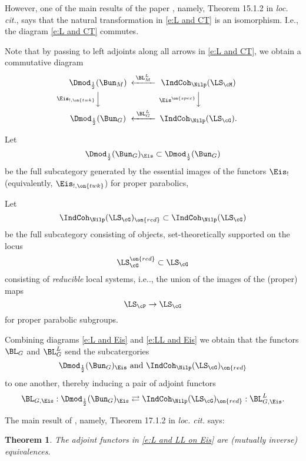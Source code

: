 \documentclass[9pt]{amsart}
\newtheorem{thm}[subsubsection]{Theorem}
\theoremstyle{remark}
\theoremstyle{definition}
\theoremstyle{remark}
\numberwithin{equation}{section}
\begin{document}
\medskip

However, one of the main results of the paper \cite{GLC3}, namely, Theorem 15.1.2 in {\it loc. cit.}, says
that the natural transformation in \eqref{e:L and CT} is an isomorphism. I.e., the diagram
\eqref{e:L and CT} commutes. 

\sssec{}

Note that by passing to left adjoints along all arrows in \eqref{e:L and CT}, we obtain a commutative diagram 
\begin{equation} \label{e:LL and Eis}
\CD
\Dmod_{\frac{1}{2}}(\Bun_M) @<{\BL^L_M}<<  \IndCoh_\Nilp(\LS_\cM)  \\
@V{\Eis_{!,\on{twk}}}VV @V{\Eis^{\on{spec}}}VV \\
\Dmod_{\frac{1}{2}}(\Bun_G) @<{\BL^L_G}<< \IndCoh_\Nilp(\LS_\cG). 
\endCD
\end{equation} 

\sssec{}

Let 
$$\Dmod_{\frac{1}{2}}(\Bun_G)_{\Eis}\subset \Dmod_{\frac{1}{2}}(\Bun_G)$$
be the full subcategory generated by the essential images of the functors $\Eis_!$ (equivalently, $\Eis_{!,\on{twk}}$) for proper
parabolics,

\medskip

Let 
$$\IndCoh_\Nilp(\LS_\cG)_{\on{red}}\subset  \IndCoh_\Nilp(\LS_\cG)$$
be the full subcategory consisting of objects, set-theoretically supported on the locus
$$\LS^{\on{red}}_\cG\subset \LS_\cG$$
consisting of \emph{reducible} local systems, i.e.., the union of the images of the (proper) maps
$$\LS_\cP\to \LS_\cG$$
for proper parabolic subgroups.

\medskip

Combining diagrams \eqref{e:L and Eis} and \eqref{e:LL and Eis} we obtain that the functors 
$\BL_G$ and $\BL_G^L$ send the subcatergories
$$\Dmod_{\frac{1}{2}}(\Bun_G)_{\Eis} \text{ and }  \IndCoh_\Nilp(\LS_\cG)_{\on{red}}$$
to one another, thereby inducing a pair of adjoint functors
\begin{equation} \label{e:L and LL on Eis}
\BL_{G,\Eis}:\Dmod_{\frac{1}{2}}(\Bun_G)_{\Eis}\rightleftarrows \IndCoh_\Nilp(\LS_\cG)_{\on{red}}:\BL^L_{G,\Eis}.
\end{equation}

\medskip

The main result of \cite{GLC3}, namely, Theorem 17.1.2 in {\it loc. cit.} says:

\begin{thm} \label{t:equiv on Eis}
The adjoint functors in \eqref{e:L and LL on Eis} are (mutually inverse) equivalences.
\end{thm} 
\end{document}

